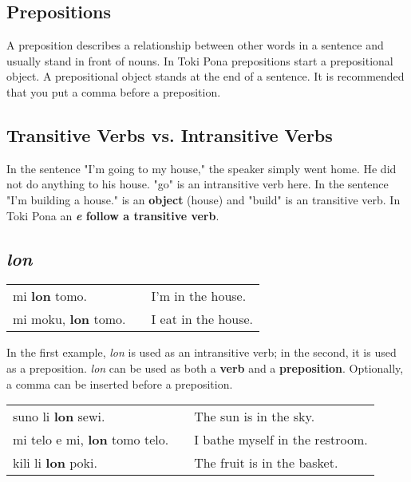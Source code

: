 %
\subsection*{Prepositions}
%
A preposition describes a relationship between other words in a sentence  and usually stand in front of nouns. 
In Toki Pona prepositions start a prepositional object. 
A prepositional object stands at the end of a sentence. 
It is recommended that you put a comma before a preposition.
%
\subsection*{Transitive Verbs vs. Intransitive Verbs}
%
In the sentence "I'm going to my house," the speaker simply went home.
He did not do anything to his house. 
"go" is an intransitive verb here.
In the sentence "I'm building a house." is an \textbf{object} (house) and "build" is an transitive verb.
In Toki Pona an \textbf{\textit{e} follow a transitive verb}. 
%
\subsection*{\textit{lon}}
%
\begin{supertabular}{p{5,5cm}|ll}
mi \textbf{lon} tomo. && I'm in the house. \\
mi moku, \textbf{lon} tomo. && I eat in the house. \\
\end{supertabular} 

In the first example, \textit{lon} is used as an intransitive verb; in the second, it is used as a preposition. 
\textit{lon} can be used as both a \textbf{verb} and a \textbf{preposition}. 
Optionally, a comma can be inserted before a preposition.

\begin{supertabular}{p{5,5cm}|ll}
suno li \textbf{lon} sewi. && The sun is in the sky. \\
mi telo e mi, \textbf{lon} tomo telo. && I bathe myself in the restroom. \\
kili li \textbf{lon} poki. && The fruit is in the basket. \\
\end{supertabular} 
%

